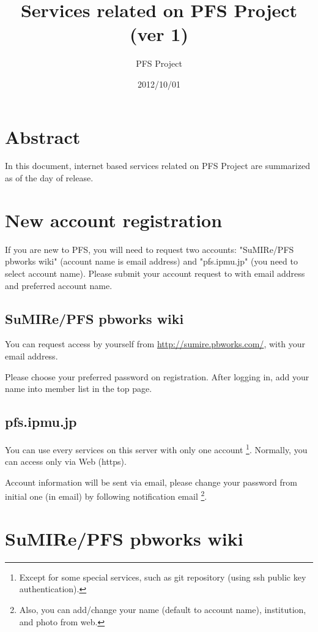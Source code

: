 \documentclass[a4paper,notitlepage]{article}
\title{Services related on PFS Project (ver 1)}
\author{PFS Project}
\date{2012/10/01}
\begin{document}
\maketitle
\tableofcontents

\section{Abstract}

In this document, internet based services related on PFS Project are summarized 
as of the day of release. 

\section{New account registration}

If you are new to PFS, you will need to request two accounts: 
"SuMIRe/PFS pbworks wiki" (account name is email address) 
and "pfs.ipmu.jp" (you need to select account name). 
Please submit your account request to \tbd 
with email address and preferred account name.

\subsection{SuMIRe/PFS pbworks wiki}

You can request access by yourself from \url{http://sumire.pbworks.com/}, 
with your email address.

Please choose your preferred password on registration. 
After logging in, add your name into member list in the top page. 

\subsection{pfs.ipmu.jp}

You can use every services on this server with only one account
\footnote{Except for some special services, such as git repository (using 
ssh public key authentication).}.
Normally, you can access only via Web (https). 

Account information will be sent via email, please change your password 
from initial one (in email) by following notification email 
\footnote{Also, you can add/change your name (default to account name), 
institution, and photo from web.}. 

\section{SuMIRe/PFS pbworks wiki}
\end{document}
